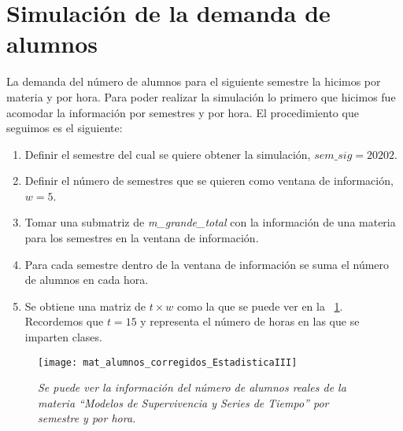 \section{Simulación de la demanda de alumnos} \label{SimDemandaAlumnos}

La demanda del número de alumnos para el siguiente semestre la hicimos por materia y por hora. Para poder realizar la simulación lo primero que hicimos fue acomodar la información por semestres y por hora. El procedimiento que seguimos es el siguiente:
  
  \begin{enumerate}
\item Definir el semestre del cual se quiere obtener la simulación, $sem\_sig = 20202$.

\item Definir el número de semestres que se quieren como ventana de información, $w = 5$.

\item Tomar una submatriz de \textit{m\_grande\_total} con la información de una materia para los semestres en la ventana de información.

\item Para cada semestre dentro de la ventana de información se suma el número de alumnos en cada hora.

\item Se obtiene una matriz de $t \times w$ como la que se puede ver en la \figurename{~\ref{matAl_corregidos}}. Recordemos que $t = 15$ y representa el número de horas en las que se imparten clases.
\end{enumerate}

\begin{figure}[h]
\centering
\texttt{[image: mat\_alumnos\_corregidos\_EstadisticaIII]} %
\caption[\textit{Matriz con alumnos de ``Modelos de Supervivencia y Series de Tiempo''}]{\textit{Se puede ver la información del número de alumnos reales de la materia ``Modelos de Supervivencia y Series de Tiempo'' por semestre y por hora.}}\label{matAl_corregidos}
\end{figure}


